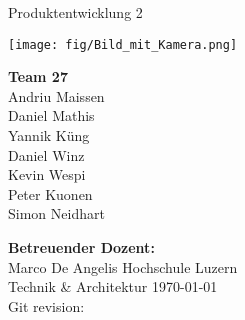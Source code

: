     \begin{titlepage}
        \begin{center}
            \makeatletter
            {\Large Produktentwicklung 2} \\
            \vfill{}
            {\LARGE \@title}
            \vfill{}
            \begin{minipage}{0.60\textwidth}
                \texttt{[image: fig/Bild\_mit\_Kamera.png]}
            \end{minipage}
            \begin{minipage}{0.16\textwidth}
                {\textbf{Team 27} \\
                Andriu Maissen \\
                Daniel Mathis \\
                Yannik Küng \\
                Daniel Winz \\
                Kevin Wespi \\
                Peter Kuonen \\
                Simon Neidhart}
            \end{minipage}
            \vfill{}
            {\textbf{Betreuender Dozent:} \\
            Marco De Angelis}
            \vfill{}
            {Hochschule Luzern \\
            Technik \& Architektur}
            \vfill
            {\today \\
            Git revision: 
            }
            \makeatother
        \end{center}
    \end{titlepage}

